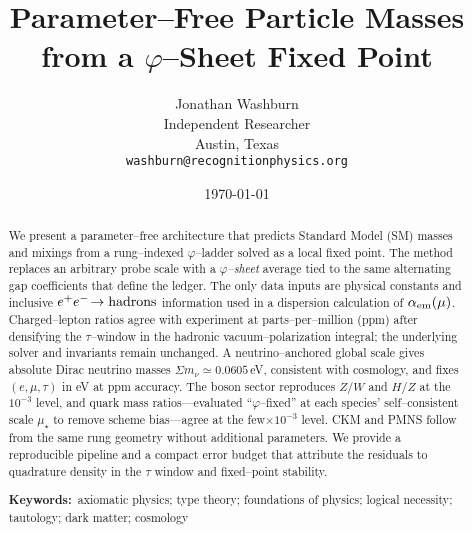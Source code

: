 \documentclass[11pt]{article}
\title{Parameter--Free Particle Masses from a $\varphi$--Sheet Fixed Point}
\author{Jonathan Washburn\\Independent Researcher\\Austin, Texas\\\texttt{washburn@recognitionphysics.org}}
\date{\today}
\newcommand{\keyword}[1]{\textbf{Keywords:}~#1}
\begin{document}
\maketitle

\begin{abstract}
We present a parameter--free architecture that predicts Standard Model (SM) masses and mixings from a rung--indexed $\varphi$--ladder solved as a local fixed point. The method replaces an arbitrary probe scale with a \emph{$\varphi$--sheet} average tied to the same alternating gap coefficients that define the ledger. The only data inputs are physical constants and inclusive $e^+e^-\!\to{\rm hadrons}$ information used in a dispersion calculation of $\alpha_{\rm em}(\mu)$. Charged--lepton ratios agree with experiment at parts--per--million (ppm) after densifying the $\tau$--window in the hadronic vacuum--polarization integral; the underlying solver and invariants remain unchanged. A neutrino--anchored global scale gives absolute Dirac neutrino masses $\Sigma m_\nu\simeq 0.0605$\,eV, consistent with cosmology, and fixes $(e,\mu,\tau)$ in eV at ppm accuracy. The boson sector reproduces $Z/W$ and $H/Z$ at the $10^{-3}$ level, and quark mass ratios—evaluated ``$\varphi$--fixed'' at each species' self--consistent scale $\mu_\star$ to remove scheme bias—agree at the few$\times 10^{-3}$ level. CKM and PMNS follow from the same rung geometry without additional parameters. We provide a reproducible pipeline and a compact error budget that attribute the residuals to quadrature density in the $\tau$ window and fixed--point stability.


\keyword{axiomatic physics; type theory; foundations of physics; logical necessity; tautology; dark matter; cosmology} 


\end{abstract}
\end{document}

